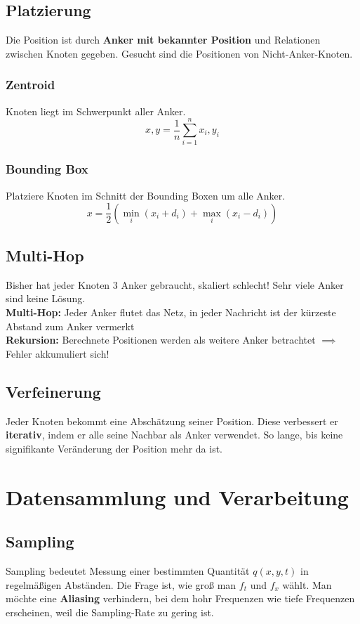 \documentclass[a4paper]{article}
\begin{document}
\subsection{Platzierung}
Die Position ist durch \textbf{Anker mit bekannter Position} und Relationen zwischen Knoten gegeben. Gesucht sind die Positionen von Nicht-Anker-Knoten.

\subsubsection{Zentroid}
Knoten liegt im Schwerpunkt aller Anker. 
$$x,y = \frac{1}{n} \sum_{i=1}^{n}x_i,y_i$$
\subsubsection{Bounding Box}
Platziere Knoten im Schnitt der Bounding Boxen um alle Anker.
$$x = \frac{1}{2}(\min _i(x_i+d_i) + \max _i(x_i-d_i))$$
\subsection{Multi-Hop}
Bisher hat jeder Knoten 3 Anker gebraucht, skaliert schlecht! Sehr viele Anker sind keine Lösung.\\
 
\textbf{Multi-Hop:} Jeder Anker flutet das Netz, in jeder Nachricht ist der kürzeste Abstand zum Anker vermerkt\\

\textbf{Rekursion:} Berechnete Positionen werden als weitere Anker betrachtet $\implies$ Fehler akkumuliert sich! 

\subsection{Verfeinerung}
Jeder Knoten bekommt eine Abschätzung seiner Position. Diese verbessert er \textbf{iterativ}, indem er alle seine Nachbar als Anker verwendet. So lange, bis keine signifikante Veränderung der Position mehr da ist.

\newpage
\section{Datensammlung und Verarbeitung}
\subsection{Sampling}
Sampling bedeutet Messung einer bestimmten Quantität $q(x,y,t)$ in regelmäßigen Abständen. Die Frage ist, wie groß man $f_t$ und $f_x$ wählt. Man möchte eine \textbf{Aliasing} verhindern, bei dem hohr Frequenzen wie tiefe Frequenzen erscheinen, weil die Sampling-Rate zu gering ist.\\
\end{document}
